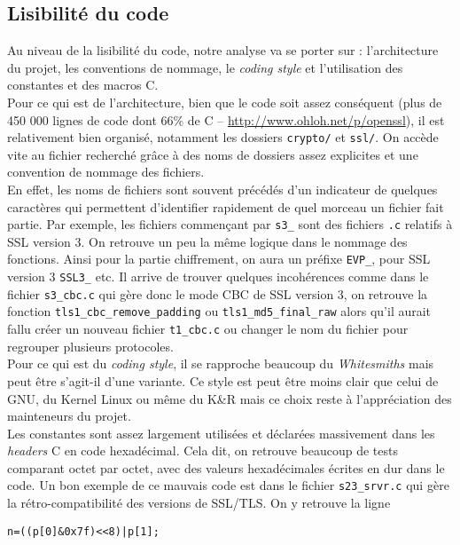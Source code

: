 \subsection{Lisibilité du code}
Au niveau de la lisibilité du code, notre analyse va se porter sur : l'architecture du projet, les conventions de nommage, le \textit{coding style} et l'utilisation des constantes et des macros C.\\


Pour ce qui est de l'architecture, bien que le code soit assez conséquent (plus de 450 000 lignes de code dont 66\% de C -- \url{http://www.ohloh.net/p/openssl}), il est relativement bien organisé, notamment les dossiers \verb+crypto/+ et \verb+ssl/+. On accède vite au fichier recherché grâce à des noms de dossiers assez explicites et une convention de nommage des fichiers.\\


En effet, les noms de fichiers sont souvent précédés d'un indicateur de quelques caractères qui permettent d'identifier rapidement de quel morceau un fichier fait partie. Par exemple, les fichiers commençant par \verb+s3_+ sont des fichiers \verb+.c+ relatifs à SSL version 3. On retrouve un peu la même logique dans le nommage des fonctions. Ainsi pour la partie chiffrement, on aura un préfixe \verb+EVP_+, pour SSL version 3 \verb+SSL3_+ etc. Il arrive de trouver quelques incohérences comme dans le fichier \verb+s3_cbc.c+ qui gère donc le mode CBC de SSL version 3, on retrouve la fonction \verb+tls1_cbc_remove_padding+ ou \verb+tls1_md5_final_raw+ alors qu'il aurait fallu créer un nouveau fichier \verb+t1_cbc.c+ ou changer le nom du fichier pour regrouper plusieurs protocoles.\\


Pour ce qui est du \textit{coding style}, il se rapproche beaucoup du \textit{Whitesmiths} mais peut être s'agit-il d'une variante. Ce style est peut être moins clair que celui de GNU, du Kernel Linux ou même du K\&R mais ce choix reste à l'appréciation des mainteneurs du projet.\\


Les constantes sont assez largement utilisées et déclarées massivement dans les \textit{headers} C en code hexadécimal. Cela dit, on retrouve beaucoup de tests comparant octet par octet, avec des valeurs hexadécimales écrites en dur dans le code. Un bon exemple de ce mauvais code est dans le fichier \verb+s23_srvr.c+ qui gère la rétro-compatibilité des versions de SSL/TLS. On y retrouve la ligne 
\begin{lstlisting}[style=customc,label=badcode, caption=Exemple de mauvais code d'OpenSSL]
n=((p[0]&0x7f)<<8)|p[1];
\end{lstlisting}

